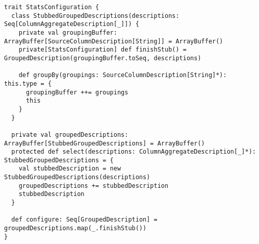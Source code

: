 \begin{lstlisting}[caption=StatsConfiguration, label=code:config, float]
trait StatsConfiguration {
  class StubbedGroupedDescriptions(descriptions: Seq[ColumnAggregateDescription[_]]) {
    private val groupingBuffer: ArrayBuffer[SourceColumnDescription[String]] = ArrayBuffer()
    private[StatsConfiguration] def finishStub() = GroupedDescription(groupingBuffer.toSeq, descriptions)

    def groupBy(groupings: SourceColumnDescription[String]*): this.type = {
      groupingBuffer ++= groupings
      this
    }
  }

  private val groupedDescriptions: ArrayBuffer[StubbedGroupedDescriptions] = ArrayBuffer()
  protected def select(descriptions: ColumnAggregateDescription[_]*): StubbedGroupedDescriptions = {
    val stubbedDescription = new StubbedGroupedDescriptions(descriptions)
    groupedDescriptions += stubbedDescription
    stubbedDescription
  }

  def configure: Seq[GroupedDescription] = groupedDescriptions.map(_.finishStub())
}
\end{lstlisting}